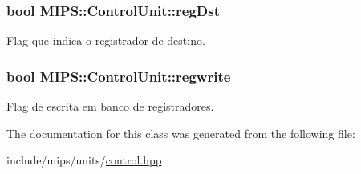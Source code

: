 \subsubsection[{\texorpdfstring{reg\+Dst}{regDst}}]{\setlength{\rightskip}{0pt plus 5cm}bool M\+I\+P\+S\+::\+Control\+Unit\+::reg\+Dst}\hypertarget{classMIPS_1_1ControlUnit_a4efae70e7973481e3f1bb8f91ba22322}{}\label{classMIPS_1_1ControlUnit_a4efae70e7973481e3f1bb8f91ba22322}
Flag que indica o registrador de destino. 
\subsubsection[{\texorpdfstring{regwrite}{regwrite}}]{\setlength{\rightskip}{0pt plus 5cm}bool M\+I\+P\+S\+::\+Control\+Unit\+::regwrite}\hypertarget{classMIPS_1_1ControlUnit_a18884b753a77aa99c9ff404e16c6ac7a}{}\label{classMIPS_1_1ControlUnit_a18884b753a77aa99c9ff404e16c6ac7a}
Flag de escrita em banco de registradores. 

The documentation for this class was generated from the following file\+:\begin{DoxyCompactItemize}
\item 
include/mips/units/\hyperlink{control_8hpp}{control.\+hpp}\end{DoxyCompactItemize}

